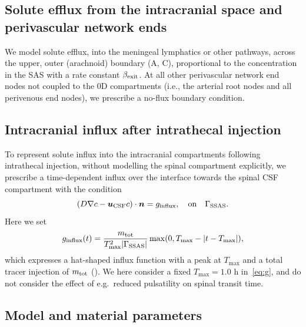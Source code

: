 \documentclass[fleqn,10pt]{wlscirep}
\begin{document}
\subsection*{Solute efflux from the intracranial space and perivascular network ends}

We model solute efflux, into the meningeal lymphatics or other
pathways, across the upper, outer (arachnoid) boundary
(A, C), proportional to the
concentration in the SAS with a rate constant $\beta_{\rm exit}$. At all other perivascular network end nodes not coupled to the 0D
compartments (i.e., the arterial root nodes and all perivenous end
nodes), we prescribe a no-flux boundary condition.

\subsection*{Intracranial influx after intrathecal injection}

To represent solute influx into the intracranial compartments
following intrathecal injection, without modelling the spinal
compartment explicitly, we prescribe a time-dependent influx 
over the interface towards the spinal CSF compartment with the condition
\begin{equation*}
  (D \nabla c - \bm u_{\rm CSF} c ) \cdot \bm{n} = g_{\mathrm{influx}},  \quad \mathrm{on}  \quad \Gamma_{\mathrm{SSAS}}.
\end{equation*}
Here we set
\begin{equation}
  g_\mathrm{influx}(t) = \frac{m_{\rm tot}}{T_{\rm max}^2 |\Gamma_{\rm SSAS}|} \max(0, T_{\rm max} - |t - T_{\rm max}|), 
  \label{eq:g}
\end{equation}
which expresses a hat-shaped influx function with a peak at $T_{\max}$ and a total tracer injection of $m_{\rm tot}$ (). We here consider a fixed $T_{\max} = 1.0$ h in~\eqref{eq:g}, and do not consider the effect of e.g.~reduced pulsatility on spinal transit time.

\subsection*{Model and material parameters}
\end{document}
